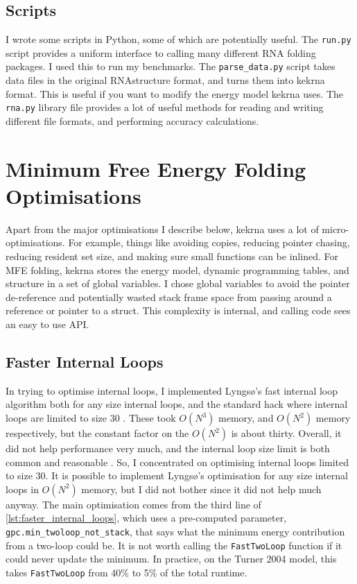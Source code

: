 \documentclass{cshonours}
\begin{document}
\subsection{Scripts}
I wrote some scripts in Python, some of which are potentially useful. The \texttt{run.py} script provides a uniform interface to calling many different RNA folding packages. I used this to run my benchmarks. The \texttt{parse\_data.py} script takes data files in the original RNAstructure format, and turns them into kekrna format. This is useful if you want to modify the energy model kekrna uses. The \texttt{rna.py} library file provides a lot of useful methods for reading and writing different file formats, and performing accuracy calculations.

\section{Minimum Free Energy Folding Optimisations}
Apart from the major optimisations I describe below, kekrna uses a lot of micro-optimisations. For example, things like avoiding copies, reducing pointer chasing, reducing resident set size, and making sure small functions can be inlined. For MFE folding, kekrna stores the energy model, dynamic programming tables, and structure in a set of global variables. I chose global variables to avoid the pointer de-reference and potentially wasted stack frame space from passing around a reference or pointer to a struct. This complexity is internal, and calling code sees an easy to use API.

\subsection{Faster Internal Loops}
In trying to optimise internal loops, I implemented Lyngs\o's fast internal loop algorithm both for any size internal loops, and the standard hack where internal loops are limited to size 30 \cite{lyngsoOptimisation}. These took $O(N^3)$ memory, and $O(N^2)$ memory respectively, but the constant factor on the $O(N^2)$ is about thirty. Overall, it did not help performance very much, and the internal loop size limit is both common and reasonable \cite{lyngsoOptimisation}. So, I concentrated on optimising internal loops limited to size 30. It is possible to implement Lyngs\o's optimisation for any size internal loops in $O(N^2)$ memory, but I did not bother since it did not help much anyway. The main optimisation comes from the third line of \autoref{lst:faster_internal_loops}, which uses a pre-computed parameter, \texttt{gpc.min\_twoloop\_not\_stack}, that says what the minimum energy contribution from a two-loop could be. It is not worth calling the \texttt{FastTwoLoop} function if it could never update the minimum. In practice, on the Turner 2004 model, this takes \texttt{FastTwoLoop} from 40\% to 5\% of the total runtime.
\end{document}
